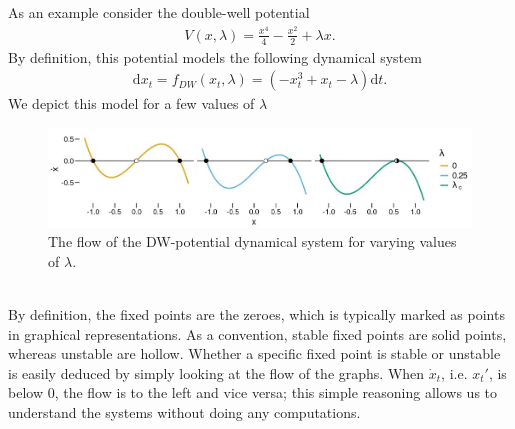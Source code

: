 As an example consider the double-well potential
\begin{align}
    V(x,\lambda) = \frac{x^4}{4} - \frac{x^2}{2} + \lambda x\label{eq:doubleWellPotential}.
\end{align}
By definition, this potential models the following dynamical system
\begin{align}
    \mathrm{d}x_t = f_{DW}(x_t, \lambda) = \left(-x_t^3 + x_t - \lambda \right) \mathrm{d}t \label{eq:originalDW}.
\end{align}
We depict this model for a few values of $\lambda$
\begin{figure}[h]
    \begin{center}
        \includegraphics[scale = .5]{figures/double_well_plot.jpeg}
        \caption{The flow of the DW-potential dynamical system for varying values of $\lambda$.}
        \label{figure:DW_dynamic_plot}
    \end{center}
\end{figure}\\
By definition, the fixed points are the zeroes, which is typically marked as points in graphical representations. As a convention, stable fixed points are solid points, whereas unstable are hollow. Whether a specific fixed point is stable or unstable is easily deduced by simply looking at the flow of the graphs. When $\dot{x}_t$, i.e. $x_t'$, is below 0, the flow is to the left and vice versa; this simple reasoning allows us to understand the systems without doing any computations.

